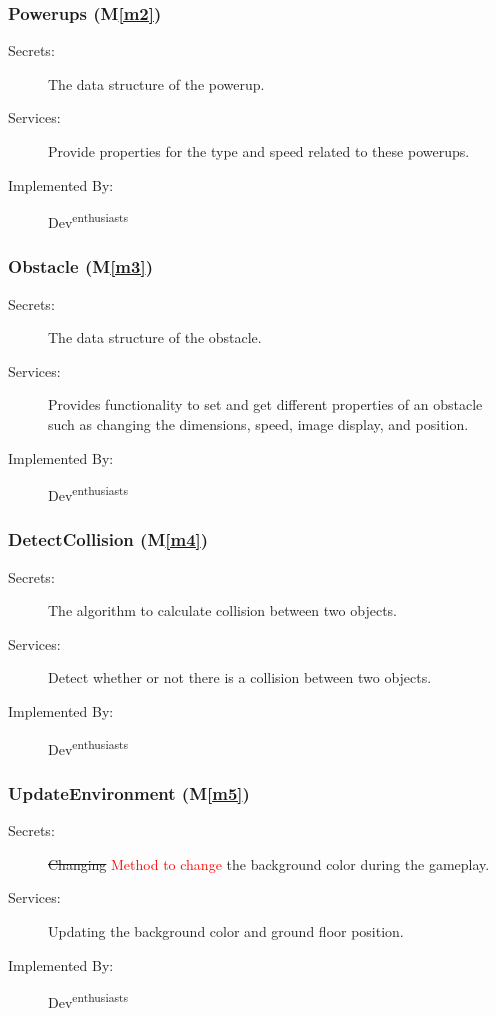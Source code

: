 \documentclass[12pt, titlepage]{article}
\newcommand{\mref}[1]{M\ref{#1}}
\begin{document}
\subsubsection{Powerups (\mref{m2})}
\begin{description}
\item[Secrets:] The data structure of the powerup.
\item[Services:] Provide properties for the type and speed related to these powerups.
\item[Implemented By:] Dev\textsuperscript{enthusiasts}
\end{description}

\subsubsection{Obstacle (\mref{m3})}
\begin{description}
\item[Secrets:] The data structure of the obstacle.
\item[Services:] Provides functionality to set and get different properties of an obstacle such as changing the dimensions, speed, image display, and position.
\item[Implemented By:] Dev\textsuperscript{enthusiasts}
\end{description}

\subsubsection{DetectCollision (\mref{m4})}
\begin{description}
\item[Secrets:]The algorithm to calculate collision between two objects.
\item[Services:] Detect whether or not there is a collision between two objects.
\item[Implemented By:] Dev\textsuperscript{enthusiasts}
\end{description}

\subsubsection{UpdateEnvironment (\mref{m5})}
\begin{description}
\item[Secrets:] \sout{Changing} \textcolor{red}{Method to change} the background color during the gameplay.
\item[Services:] Updating the background color and ground floor position. 
\item[Implemented By:] Dev\textsuperscript{enthusiasts}
\end{description}
\end{document}
